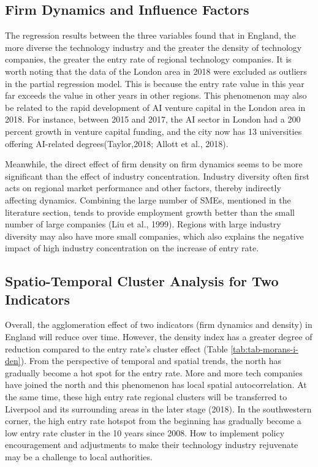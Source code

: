 \documentclass[
  12pt,
  oneside]{book}
\begin{document}
\hypertarget{firm-dynamics-and-influence-factors}{%
\subsection{Firm Dynamics and Influence Factors}\label{firm-dynamics-and-influence-factors}}

The regression results between the three variables found that in England, the more diverse the technology industry and the greater the density of technology companies, the greater the entry rate of regional technology companies. It is worth noting that the data of the London area in 2018 were excluded as outliers in the partial regression model. This is because the entry rate value in this year far exceeds the value in other years in other regions. This phenomenon may also be related to the rapid development of AI venture capital in the London area in 2018. For instance, between 2015 and 2017, the AI sector in London had a 200 percent growth in venture capital funding, and the city now has 13 universities offering AI-related degrees(Taylor,2018; Allott et al., 2018).

Meanwhile, the direct effect of firm density on firm dynamics seems to be more significant than the effect of industry concentration. Industry diversity often first acts on regional market performance and other factors, thereby indirectly affecting dynamics. Combining the large number of SMEs, mentioned in the literature section, tends to provide employment growth better than the small number of large companies (Liu et al., 1999). Regions with large industry diversity may also have more small companies, which also explains the negative impact of high industry concentration on the increase of entry rate.

\hypertarget{spatio-temporal-cluster-analysis-for-two-indicators}{%
\subsection{Spatio-Temporal Cluster Analysis for Two Indicators}\label{spatio-temporal-cluster-analysis-for-two-indicators}}

Overall, the agglomeration effect of two indicators (firm dynamics and density) in England will reduce over time. However, the density index has a greater degree of reduction compared to the entry rate's cluster effect (Table \ref{tab:tab-morans-i-den}). From the perspective of temporal and spatial trends, the north has gradually become a hot spot for the entry rate. More and more tech companies have joined the north and this phenomenon has local spatial autocorrelation. At the same time, these high entry rate regional clusters will be transferred to Liverpool and its surrounding areas in the later stage (2018). In the southwestern corner, the high entry rate hotspot from the beginning has gradually become a low entry rate cluster in the 10 years since 2008. How to implement policy encouragement and adjustments to make their technology industry rejuvenate may be a challenge to local authorities.
\end{document}
